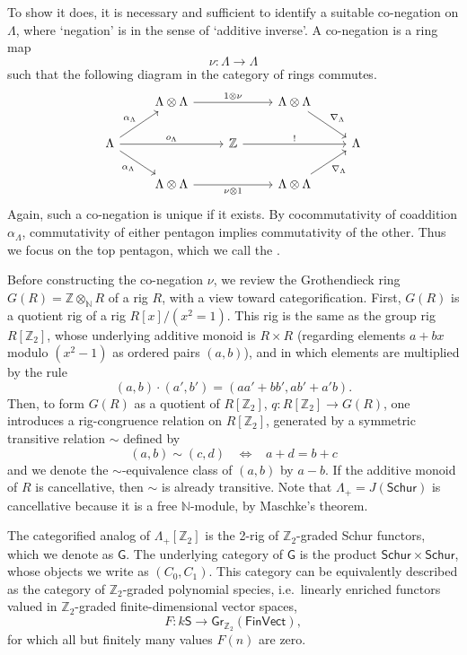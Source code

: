 \documentclass[12pt,reqno]{amsart}
\theoremstyle{plain}
\theoremstyle{definition}
\theoremstyle{remark}
\newcommand{\define}[1]{{\bf \boldmath{#1}}\index{#1}}
\newcommand{\maps}{\colon}
\newcommand{\category}[1]{\mathsf{#1}}
\newcommand{\N}{\mathbb N}
\renewcommand{\S}{\category S}
\newcommand{\Z}{\mathbb Z}
\newcommand{\namedcat}[1]{\mathsf{#1}}
\newcommand{\Schur}{\namedcat{Schur}}
\newcommand{\Vect}{\namedcat{Vect}}
\newcommand{\Fin}{\namedcat{Fin}}
\newcommand{\G}{\mathsf{G}} %
\numberwithin{thm}{section}
\begin{document}
To show it does, it is necessary and sufficient to identify a suitable co-negation on $\Lambda$, where `negation' is in the sense of `additive inverse'. A co-negation is a ring map 
\[\nu \maps \Lambda \to \Lambda\] 
such that the following diagram in the category of rings commutes.
\begin{equation}
\label{eq:conegation}
\begin{tikzcd}
    &
    \Lambda \otimes \Lambda
    \arrow[rr, "1 \otimes \nu"]
    &&
    \Lambda \otimes \Lambda
    \arrow[dr, "\nabla_\Lambda"]
    \\
    \Lambda
    \arrow[ur, "\alpha_\Lambda"]
    \arrow[dr, swap, "\alpha_\Lambda"]
    \arrow[rr, "o_\Lambda"]
    &&
    \Z
    \arrow[rr, "!"]
    &&
    \Lambda
    \\
    &
    \Lambda \otimes \Lambda
    \arrow[rr, swap, "\nu \otimes 1"]
    &&
    \Lambda \otimes \Lambda
    \arrow[ur, swap, "\nabla_\Lambda"]
\end{tikzcd}
\end{equation}
Again, such a co-negation is unique if it exists. By cocommutativity of coaddition $\alpha_\Lambda$, commutativity of either pentagon implies commutativity of the other. Thus we focus on the top pentagon, which we call the \define{co-negation equation}. 

Before constructing the co-negation $\nu$, we review the Grothendieck ring $G(R)= \Z \otimes_{\mathbb{N}} R$ of a rig $R$, with a view toward categorification. First, $G(R)$ is a quotient rig of a rig $R[x]/(x^2 = 1)$. This rig is the same as the group rig $R[\Z_2]$, whose underlying additive monoid is $R \times R$ (regarding elements $a + bx$ modulo $(x^2-1)$ as ordered pairs $(a, b)$), and in which elements are multiplied by the rule 
\[(a, b) \cdot (a', b') = (aa' + bb', ab' + a'b).\]
Then, to form $G(R)$ as a quotient of $R[\Z_2]$, $q \maps R[\Z_2] \to G(R)$, one introduces a rig-congruence relation on $R[\Z_2]$, generated by a symmetric transitive relation $\sim$ defined by 
\[(a, b) \sim (c, d)\;\;\; \Leftrightarrow \;\;\; a+d = b + c\]
and we denote the $\sim$-equivalence class of $(a, b)$ by $a - b$. If the additive monoid of $R$ is cancellative, then $\sim$ is already transitive. Note that $\Lambda_+ = J(\Schur)$ is cancellative because it is a free $\N$-module, by Maschke's theorem. 

The categorified analog of $\Lambda_+[\Z_2]$ is the 2-rig of $\Z_2$-graded Schur functors, which we denote as $\G$. The underlying category of $\G$ is the product $\Schur \times \Schur$, whose objects we write as $(C_0, C_1)$. This category can be equivalently described as the category of $\Z_2$-graded polynomial species, i.e.\ linearly enriched functors valued in $\Z_2$-graded finite-dimensional vector spaces, 
\[
F \maps k\S \to \mathsf{Gr}_{\Z_2}(\Fin\Vect),
\]
for which all but finitely many values $F(n)$ are zero. 
\end{document}
